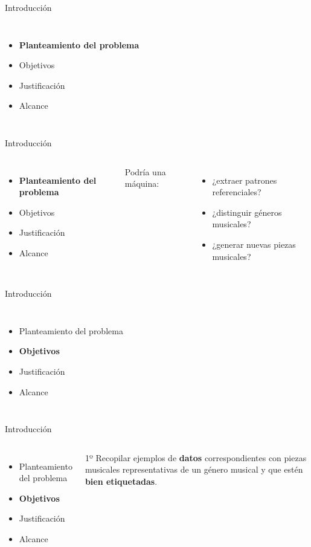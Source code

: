 \documentclass{beamer}
\begin{document}
\begin{frame}{Introducción}
  \begin{columns}
  \column{5.7cm}
  \begin{itemize}
    \item \textbf{Planteamiento del problema}
    \item Objetivos
    \item Justificación
    \item Alcance
  \end{itemize}
  \column{6cm}
  \end{columns}
  \end{frame}

  
\begin{frame}{Introducción}
\begin{columns}
\column{5.7cm}
\begin{itemize}
  \item \textbf{Planteamiento del problema}
  \item Objetivos
  \item Justificación
  \item Alcance
\end{itemize}
\column{6cm}
Podría una máquina:
\begin{itemize}
  \item ¿extraer patrones referenciales?
  \item ¿distinguir géneros musicales?
  \item ¿generar nuevas piezas musicales?
\end{itemize}
\end{columns}
\end{frame}

\begin{frame}{Introducción}
\begin{columns}
\column{5.5cm}
\begin{itemize}
  \item Planteamiento del problema
  \item \textbf{Objetivos}
  \item Justificación
  \item Alcance
\end{itemize}
\column{6cm}
\end{columns}
\end{frame}

\begin{frame}{Introducción}
  \begin{columns}
  \column{5.5cm}
  \begin{itemize}
    \item Planteamiento del problema
    \item \textbf{Objetivos}
    \item Justificación
    \item Alcance
  \end{itemize}
  \column{6cm}
  1º Recopilar ejemplos de \textbf{datos} correspondientes con piezas musicales representativas de un género musical y que estén \textbf{bien etiquetadas}.
  \end{columns}
\end{frame}
\end{document}
